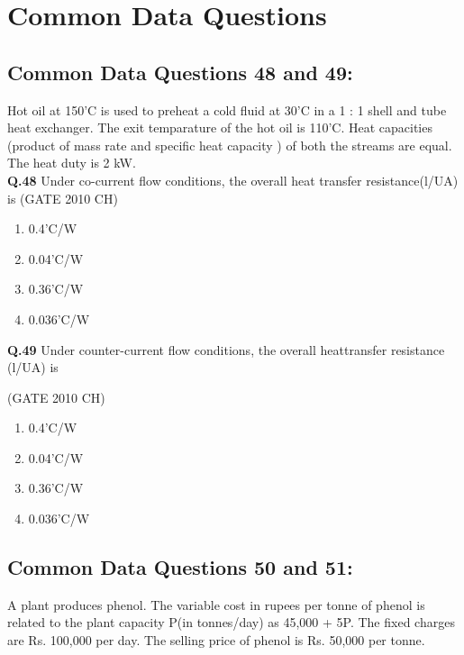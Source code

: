\documentclass[journal,12pt,onecolumn]{exam}
\theoremstyle{remark}
\begin{document}
\section{Common Data Questions}
\subsection{Common Data Questions 48 and 49:}

Hot oil at 150'C is used to preheat a cold fluid at 30'C in a  1 : 1 shell and tube heat exchanger. The exit temparature of the hot oil is 110'C. Heat capacities (product of mass rate and specific heat capacity ) of both the streams are equal. The heat duty is 2 kW.\\ 

 \noindent
 \textbf{Q.48}
  Under co-current flow conditions, the overall heat transfer resistance(l/UA) is
  \hfill{(GATE 2010 CH)}\\
  \begin{enumerate}
      \item 0.4'C/W
      \item 0.04'C/W
      \item 0.36'C/W
      \item 0.036'C/W
  \end{enumerate}

   \noindent
   \textbf{Q.49}
    Under counter-current flow conditions, the overall heattransfer resistance (l/UA) is
 
 \hfill{(GATE 2010 CH)}\\

  
  \begin{enumerate}
      \item 0.4'C/W
      \item 0.04'C/W
      \item 0.36'C/W
      \item 0.036'C/W
  \end{enumerate}

\subsection{Common Data Questions 50 and 51:}

A plant produces phenol. The variable cost in rupees per tonne of phenol is related to the plant capacity P(in tonnes/day) as 45,000 + 5P. The fixed charges are Rs. 100,000 per day. The selling price of phenol is Rs. 50,000 per tonne.\\
\end{document}

